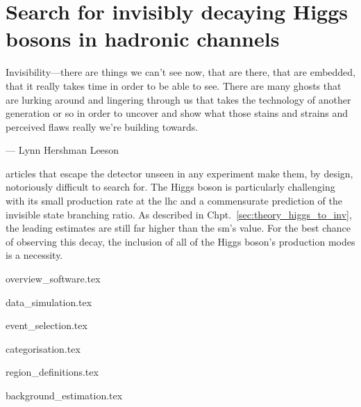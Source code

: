 \chapter{Search for invisibly decaying Higgs bosons in hadronic channels}
\label{chap:higgstoinv}

\epigraph{Invisibility---there are things we can't see now, that are there, that are embedded, that it really takes time in order to be able to see. There are many ghosts that are lurking around and lingering through us that takes the technology of another generation or so in order to uncover and show what those stains and strains and perceived flaws really we're building towards.}{--- Lynn Hershman Leeson}

articles that escape the detector unseen in any experiment make them, by design, notoriously difficult to search for. The Higgs boson is particularly challenging with its small production rate at the \acrshort{lhc} and a commensurate prediction of the invisible state branching ratio. As described in Chpt.~\ref{sec:theory_higgs_to_inv}, the leading estimates are still far higher than the \acrlong{sm}'s value. For the best chance of observing this decay, the inclusion of all of the Higgs boson's production modes is a necessity.





{overview_software.tex}




{data_simulation.tex}




{event_selection.tex}




{categorisation.tex}




{region_definitions.tex}




{background_estimation.tex}


